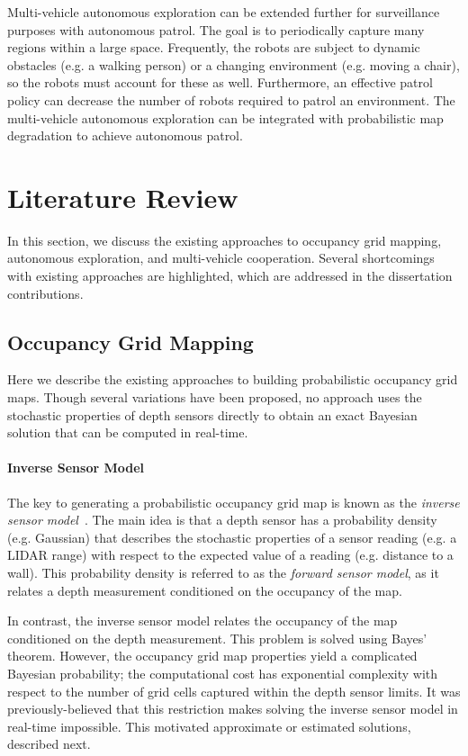 Multi-vehicle autonomous exploration can be extended further for surveillance purposes with autonomous patrol. The goal is to periodically capture many regions within a large space. Frequently, the robots are subject to dynamic obstacles (e.g. a walking person) or a changing environment (e.g. moving a chair), so the robots must account for these as well. Furthermore, an effective patrol policy can decrease the number of robots required to patrol an environment. The multi-vehicle autonomous exploration can be integrated with probabilistic map degradation to achieve autonomous patrol.

\section{Literature Review}

In this section, we discuss the existing approaches to occupancy grid mapping, autonomous exploration, and multi-vehicle cooperation. Several shortcomings with existing approaches are highlighted, which are addressed in the dissertation contributions.

\subsection{Occupancy Grid Mapping}

Here we describe the existing approaches to building probabilistic occupancy grid maps. Though several variations have been proposed, no approach uses the stochastic properties of depth sensors directly to obtain an exact Bayesian solution that can be computed in real-time.

\paragraph{Inverse Sensor Model} The key to generating a probabilistic occupancy grid map is known as the \emph{inverse sensor model}~\cite{ThrBurFox05}. The main idea is that a depth sensor has a probability density (e.g. Gaussian) that describes the stochastic properties of a sensor reading (e.g. a LIDAR range) with respect to the expected value of a reading (e.g. distance to a wall). This probability density is referred to as the \emph{forward sensor model}, as it relates a depth measurement conditioned on the occupancy of the map. 

In contrast, the inverse sensor model relates the occupancy of the map conditioned on the depth measurement. This problem is solved using Bayes' theorem. However, the occupancy grid map properties yield a complicated Bayesian probability; the computational cost has exponential complexity with respect to the number of grid cells captured within the depth sensor limits. It was previously-believed that this restriction makes solving the inverse sensor model in real-time impossible. This motivated approximate or estimated solutions, described next.

